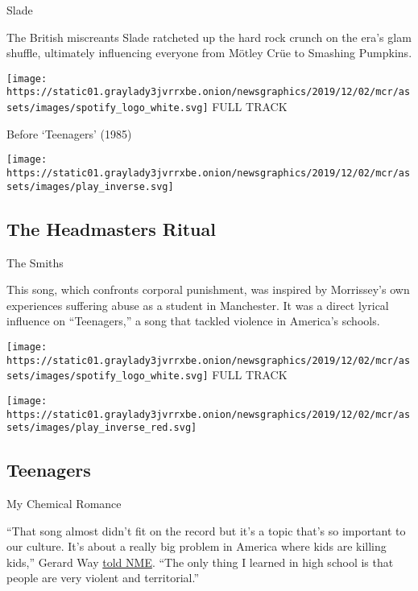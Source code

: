 Slade

The British miscreants Slade ratcheted up the hard rock crunch on the
era's glam shuffle, ultimately influencing everyone from Mötley Crüe to
Smashing Pumpkins.

\href{https://open.spotify.com/track/2Gp23sr178DBntGtqKnJez?si=COtRxRloTKi-LZKziUWn-Q}{}

\texttt{[image: https://static01.graylady3jvrrxbe.onion/newsgraphics/2019/12/02/mcr/assets/images/spotify\_logo\_white.svg]}
FULL TRACK

Before `Teenagers' (1985)

\texttt{[image: https://static01.graylady3jvrrxbe.onion/newsgraphics/2019/12/02/mcr/assets/images/play\_inverse.svg]}

\hypertarget{the-headmasters-ritual}{%
\subsection{The Headmasters Ritual}\label{the-headmasters-ritual}}

The Smiths

This song, which confronts corporal punishment, was inspired by
Morrissey's own experiences suffering abuse as a student in Manchester.
It was a direct lyrical influence on ``Teenagers,'' a song that tackled
violence in America's schools.

\href{https://open.spotify.com/track/4tFGNFIIZ9ANSewxGZyiDD?si=zHVgfOR5SPmdedo3epY9cw}{}

\texttt{[image: https://static01.graylady3jvrrxbe.onion/newsgraphics/2019/12/02/mcr/assets/images/spotify\_logo\_white.svg]}
FULL TRACK

\texttt{[image: https://static01.graylady3jvrrxbe.onion/newsgraphics/2019/12/02/mcr/assets/images/play\_inverse\_red.svg]}

\hypertarget{teenagers-1}{%
\subsection{Teenagers}\label{teenagers-1}}

My Chemical Romance

``That song almost didn't fit on the record but it's a topic that's so
important to our culture. It's about a really big problem in America
where kids are killing kids,'' Gerard Way
\href{https://www.nme.com/news/music/my-chemical-romance-127-1347470}{told
NME}. ``The only thing I learned in high school is that people are very
violent and territorial.''

